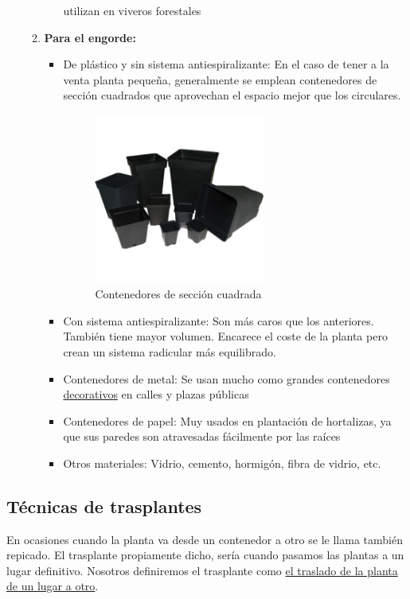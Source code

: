 \documentclass[a4paper,12pt,oneside]{article}
\begin{document}
\begin{enumerate}
\begin{enumerate}
\begin{itemize}
utilizan en viveros forestales
\end{itemize}
\item \textbf{Para el engorde:}
\begin{itemize}
\item De plástico y sin sistema antiespiralizante: En el caso de tener a la venta planta
pequeña, generalmente se emplean contenedores de sección cuadrados que
aprovechan el espacio mejor que los circulares.
\begin{figure}[htbp]
\centering
\includegraphics[width=0.6\textwidth]{./img_uf1596/maceta_cuadrada.jpg}
\caption{Contenedores de sección cuadrada}
\end{figure}
\item Con sistema antiespiralizante: Son más caros que los anteriores. También
tiene mayor volumen. Encarece el coste de la planta pero crean un sistema
radicular más equilibrado.
\item Contenedores de metal: Se usan mucho como grandes contenedores
\uline{decorativos} en calles y plazas públicas
\item Contenedores de papel: Muy usados en plantación de hortalizas, ya que sus
paredes son atravesadas fácilmente por las raíces
\item Otros materiales: Vidrio, cemento, hormigón, fibra de vidrio, etc.
\end{itemize}
\end{enumerate}
\end{enumerate}

\subsection{Técnicas de trasplantes}
\label{sec:org3f55398}
En ocasiones cuando la planta va desde un contenedor a otro se le llama
también repicado. El trasplante propiamente dicho, sería cuando pasamos las
plantas a un lugar definitivo. Nosotros definiremos el trasplante como \uline{el
traslado de la planta de un lugar a otro}.
\end{document}
